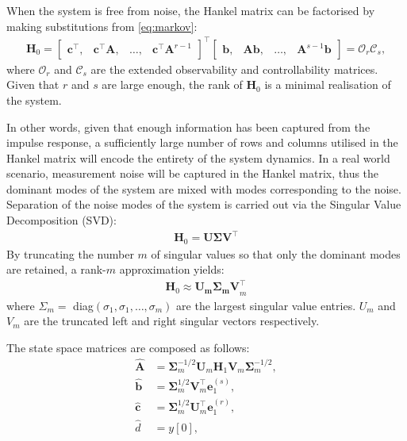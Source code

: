 When the system is free from noise, the Hankel matrix can be factorised by making substitutions from \ref{eq:markov}:
\begin{align}
\label{eq:factorised}
    \mathbf{H}_0 = 
    \begin{bmatrix}
    \mathbf{c}^{\top}, & \mathbf{c}^{\top} \mathbf{A}, & \dots, & \mathbf{c}^{\top} \mathbf{A}^{r-1}
    \end{bmatrix}^{\top}
    \begin{bmatrix}
    \mathbf{b}, & \mathbf{A} \mathbf{b}, & \dots, & \mathbf{A}^{s-1} \mathbf{b}
    \end{bmatrix}
    = \mathcal{O}_r \mathcal{C}_s,
\end{align}
where $\mathcal{O}_r$ and $\mathcal{C}_s$ are the extended observability and controllability matrices. Given that $r$ and $s$ are large enough, the rank of $\mathbf{H}_0$ is a minimal realisation of the system.

In other words, given that enough information has been captured from the impulse response, a sufficiently large number of rows and columns utilised in the Hankel matrix will encode the entirety of the system dynamics. In a real world scenario, measurement noise will be captured in the Hankel matrix, thus the dominant modes of the system are mixed with modes corresponding to the noise. Separation of the noise modes of the system is carried out via the Singular Value Decomposition (SVD):
\begin{align}
\label{eq:svd}
    \mathbf{H}_0 = \mathbf{U \Sigma V}^\top
\end{align}
By truncating the number $m$ of singular values so that only the dominant modes are retained, a rank-$m$ approximation yields:
\begin{align}
\label{eq:svdm}
    \mathbf{H}_0 \approx \mathbf{U_m \Sigma_m V}_{m}^{\top}
\end{align}
where $\Sigma_m =$ diag$(\sigma_1,\sigma_1, \dots, \sigma_m)$ are the largest singular value entries. $U_m$ and $V_m$ are the truncated left and right singular vectors respectively.

The state space matrices are composed as follows:
\begin{align}
\label{eq}
\mathbf{\hat{A}} &= \mathbf{\Sigma}_{m}^{-1/2} \mathbf{U}_m \mathbf{H}_1 \mathbf{V}_m \mathbf{\Sigma}_{m}^{-1/2}, \\
\mathbf{\hat{b}} &= \mathbf{\Sigma}_{m}^{1/2} \mathbf{V}_m^{\top} \mathbf{e}_{1}^{(s)}, \\
\mathbf{\hat{c}} &= \mathbf{\Sigma}_{m}^{1/2} \mathbf{U}_{m}^{\top} \mathbf{e}_{1}^{(r)}, \\
\hat{d} &= y[0],
\end{align}

